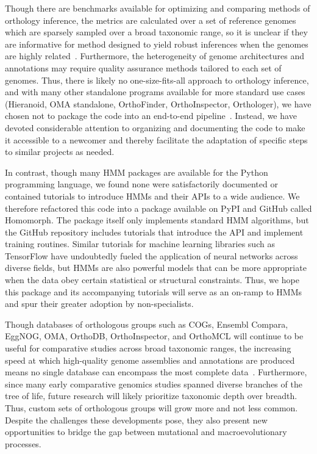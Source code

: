 Though there are benchmarks available for optimizing and comparing methods of orthology inference, the metrics are calculated over a set of reference genomes which are sparsely sampled over a broad taxonomic range, so it is unclear if they are informative for method designed to yield robust inferences when the genomes are highly related~\cite{Nevers2022}. Furthermore, the heterogeneity of genome architectures and annotations may require quality assurance methods tailored to each set of genomes. Thus, there is likely no one-size-fits-all approach to orthology inference, and with many other standalone programs available for more standard use cases (Hieranoid, OMA standalone, OrthoFinder, OrthoInspector, Orthologer), we have chosen not to package the code into an end-to-end pipeline~\cite{Kaduk2017, Altenhoff2019, Emms2019, Linard2014, Zdobnov2020}. Instead, we have devoted considerable attention to organizing and documenting the code to make it accessible to a newcomer and thereby facilitate the adaptation of specific steps to similar projects as needed.

In contrast, though many HMM packages are available for the Python programming language, we found none were satisfactorily documented or contained tutorials to introduce HMMs and their APIs to a wide audience. We therefore refactored this code into a package available on PyPI and GitHub called Homomorph. The package itself only implements standard HMM algorithms, but the GitHub repository includes tutorials that introduce the API and implement training routines. Similar tutorials for machine learning libraries such as TensorFlow have undoubtedly fueled the application of neural networks across diverse fields, but HMMs are also powerful models that can be more appropriate when the data obey certain statistical or structural constraints. Thus, we hope this package and its accompanying tutorials will serve as an on-ramp to HMMs and spur their greater adoption by non-specialists.

Though databases of orthologous groups such as COGs, Ensembl Compara, EggNOG, OMA, OrthoDB, OrthoInspector, and OrthoMCL will continue to be useful for comparative studies across broad taxonomic ranges, the increasing speed at which high-quality genome assemblies and annotations are produced means no single database can encompass the most complete data~\cite{Galperin2020, Herrero2016, HuertaCepas2018, Altenhoff2020, Zdobnov2020, Nevers2018, Chen2006}. Furthermore, since many early comparative genomics studies spanned diverse branches of the tree of life, future research will likely prioritize taxonomic depth over breadth. Thus, custom sets of orthologous groups will grow more and not less common. Despite the challenges these developments pose, they also present new opportunities to bridge the gap between mutational and macroevolutionary processes.

